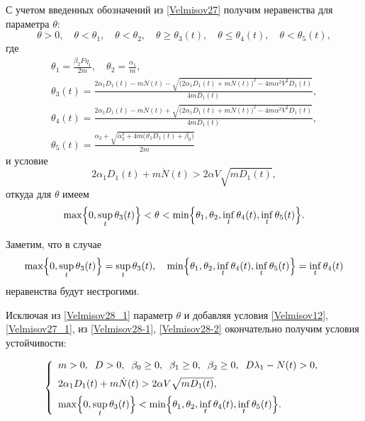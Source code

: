 С учетом введенных обозначений из \eqref{Velmisov27} получим неравенства для параметра $\theta $:
\begin{equation}
\theta >0,\quad \theta < \theta_1, \quad \theta <\theta_2 ,\quad\theta \ge \theta_3(t),\quad\theta \le \theta_4(t), \quad\theta <\theta_5(t),
\label{Velmisov28-1} 
\end{equation}
где 
\begin{gather}
\theta_1=\frac{\beta _{2}F \eta _{1}}{2m}, \quad  \theta_2=\frac{\alpha_1 }{m},\\
\theta_3(t)=\frac{2\alpha_1D_1(t)-m\dot{N}(t) -\sqrt{ \bigl(2\alpha_1D_1(t) +m\dot{N}(t)\bigr)^{2} -4m\alpha ^{2} V^{2} D_1(t)} }{4mD_1(t)} ,
\\ 
\theta_4(t)=\frac{2\alpha_1D_1(t)-m\dot{N}(t)+\sqrt{\bigl(2\alpha_1D_1(t)+ m\dot{N}(t)\bigr)^{2} -4m\alpha ^{2} V^{2} D_1(t)} }{4mD_1(t)} , 
\\
\theta_5(t)=\frac{ \alpha_2 +\sqrt{\alpha_2^{2} +4m\bigl(\vartheta _{1} D_1(t)+\beta _{0}\bigr)} }{2m}
\end{gather}
и условие
\begin{equation}
2\alpha_1 D_1(t)+m\dot{N}(t)>2\alpha V\sqrt{mD_1(t)} ,
\label{Velmisov28-2} 
\end{equation}
откуда для $\theta$ имеем
\begin{equation} \label{Velmisov28_1} 
\max \Bigl\{0, \sup_t\theta_3(t)\Bigr\}<\theta<\min \Bigl\{ \theta_1, \theta_2 , \inf_t\theta_4(t), \inf_t\theta_5(t)\Bigr\}.   
\end{equation} 

Заметим, что в случае 
\[
\max \Bigl\{0, \sup_t\theta_3(t)\Bigr\}= \sup_t\theta_3(t), 
\quad
\min \Bigl\{ \theta_1, \theta_2 , \inf_t\theta_4(t), \inf_t\theta_5(t)\Bigr\}=\inf_t\theta_4(t)
\]
неравенства будут нестрогими.

Исключая из \eqref{Velmisov28_1} параметр $\theta $ и добавляя условия \eqref{Velmisov12}, \eqref{Velmisov27_1}, из \eqref{Velmisov28-1}, \eqref{Velmisov28-2}  окончательно получим условия устойчивости:

\begin{equation} \label{Velmisov29} 
\left\{\begin{array}{l} 
m>0,\; \; D>0,\; \; \beta _{0} \ge 0,\; \; \beta _{1} \ge 0,\; \; \beta _{2} \ge 0,\; \; D\lambda _{1} -N(t) > 0, 
\\[2mm]
2\alpha_1 D_1(t)+m\dot{N}(t)>2\alpha V\sqrt{mD_1(t)} , \\[2mm]
\displaystyle
\max \Bigl\{0, \sup_t\theta_3(t)\Bigr\} < \min \Bigl\{ \theta_1, \theta_2 , \inf_t\theta_4(t), \inf_t\theta_5(t)\Bigr\}. \end{array}\right.  
\end{equation} 

